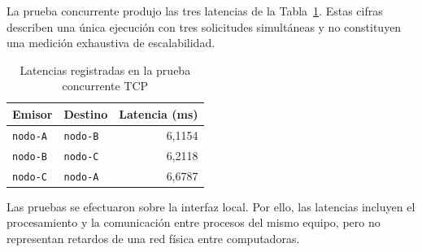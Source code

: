 La prueba concurrente produjo las tres latencias de la
Tabla~\ref{tab:tcp-jordan-concurrencia}. Estas cifras describen una única
ejecución con tres solicitudes simultáneas y no constituyen una medición
exhaustiva de escalabilidad.

\begin{table}[htbp]
\centering
\caption{Latencias registradas en la prueba concurrente TCP}
\label{tab:tcp-jordan-concurrencia}
\begin{tabular}{llr}
\hline
\textbf{Emisor} & \textbf{Destino} & \textbf{Latencia (ms)} \\
\hline
\texttt{nodo-A} & \texttt{nodo-B} & 6,1154 \\
\texttt{nodo-B} & \texttt{nodo-C} & 6,2118 \\
\texttt{nodo-C} & \texttt{nodo-A} & 6,6787 \\
\hline
\end{tabular}
\end{table}

Las pruebas se efectuaron sobre la interfaz local. Por ello, las latencias
incluyen el procesamiento y la comunicación entre procesos del mismo equipo,
pero no representan retardos de una red física entre computadoras.
